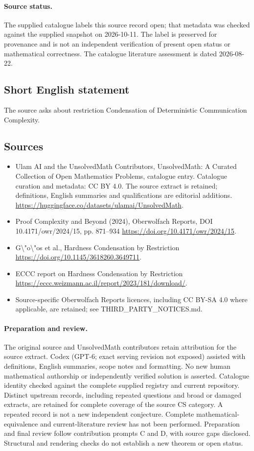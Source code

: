 \documentclass[11pt]{article}
\begin{document}
\paragraph{Source status.}
The supplied catalogue labels this source record open; that metadata was checked against the supplied snapshot on 2026-10-11. The label is preserved for provenance and is not an independent verification of present open status or mathematical correctness. The catalogue literature assessment is dated 2026-08-22.
\subsection{Short English statement}
The source asks about restriction Condensation of Deterministic Communication Complexity.
\subsection{Sources}
\begin{itemize}
\item[S1] Ulam AI and the UnsolvedMath Contributors, UnsolvedMath: A Curated Collection of Open Mathematics Problems, catalogue entry. Catalogue curation and metadata: CC BY 4.0. The source extract is retained; definitions, English summaries and qualifications are editorial additions.
\url{https://huggingface.co/datasets/ulamai/UnsolvedMath}.
\item[S2] Proof Complexity and Beyond (2024), Oberwolfach Reports, DOI 10.4171/owr/2024/15, pp. 871--934
\url{https://doi.org/10.4171/owr/2024/15}.
\item[S3] G\textbackslash{}"o\textbackslash{}"os et al., Hardness Condensation by Restriction
\url{https://doi.org/10.1145/3618260.3649711}.
\item[S4] ECCC report on Hardness Condensation by Restriction
\url{https://eccc.weizmann.ac.il/report/2023/181/download/}.
\item Source-specific Oberwolfach Reports licences, including CC BY-SA 4.0 where applicable, are retained; see THIRD\_PARTY\_NOTICES.md.
\end{itemize}
\paragraph{Preparation and review.}
The original source and UnsolvedMath contributors retain attribution for the source extract. Codex (GPT-6; exact serving revision not exposed) assisted with definitions, English summaries, scope notes and formatting. No new human mathematical authorship or independently verified solution is asserted. Catalogue identity checked against the complete supplied registry and current repository. Distinct upstream records, including repeated questions and broad or damaged extracts, are retained for complete coverage of the source CS category. A repeated record is not a new independent conjecture. Complete mathematical-equivalence and current-literature review has not been performed. Preparation and final review follow contribution prompts C and D, with source gaps disclosed. Structural and rendering checks do not establish a new theorem or open status.
\label{end:statement}
\end{document}
